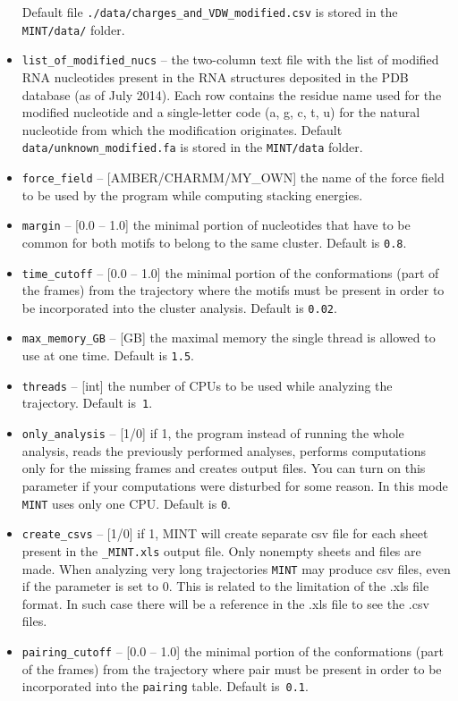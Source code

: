\documentclass[12pt]{article}
\begin{document}
\begin{itemize}
Default file {\tt ./data/charges\_and\_VDW\_modified.csv} is stored in the {\tt MINT/data/} folder.
\item {\tt list\_of\_modified\_nucs} -- the two-column text file with the list of modified RNA nucleotides present in the RNA structures deposited in the PDB database (as of July 2014). Each row contains the residue name used for the modified nucleotide and a single-letter code (a, g, c, t, u) for the natural nucleotide from which the modification originates. Default {\tt data/unknown\_modified.fa} is stored in the {\tt MINT/data} folder.
\item {\tt force\_field} --  [AMBER/CHARMM/MY\_OWN] the name of the force field to be used by the program while computing stacking energies.
\item {\tt margin} -- [0.0 -- 1.0]  the minimal portion of nucleotides that have to be common for both motifs to belong to the same cluster. Default is {\tt 0.8}.
\item {\tt time\_cutoff} -- [0.0 -- 1.0] the minimal portion of the conformations (part of the frames) from the trajectory where the motifs must be present in order to be incorporated into the cluster analysis. Default is {\tt 0.02}.
\item {\tt max\_memory\_GB} -- [GB] the maximal memory the single thread is allowed to use at one time. Default is {\tt 1.5}.
\item {\tt threads} -- [int] the number of CPUs to be used while analyzing  the trajectory. Default is~{\tt 1}.
\item {\tt only\_analysis} -- [1/0] if 1, the program instead of running the whole analysis, reads the previously performed analyses, performs computations only for the missing frames and creates output files. You can turn on this parameter if your computations were disturbed for some reason. In this mode {\tt MINT} uses only one CPU. Default is {\tt 0}.
\item {\tt create\_csvs}  -- [1/0] if 1, MINT will create separate csv file for each sheet present in the {\tt \_MINT.xls} output file. Only nonempty sheets and files are made. When analyzing very long trajectories {\tt MINT} may produce csv files, even if the parameter is set to 0. This is related to the limitation of the .xls file format. In such case there will be a reference in the .xls file to see the .csv files.
\item {\tt pairing\_cutoff} -- [0.0 -- 1.0] the minimal portion of the conformations (part of the frames) from the trajectory where pair must be present in order to be incorporated into the {\tt pairing} table. Default is~{\tt 0.1}.
\end{itemize}
\end{document}
